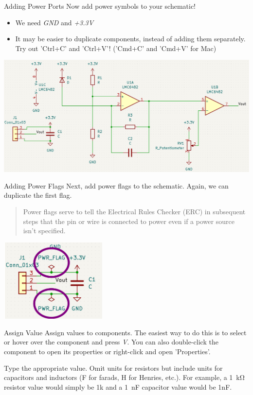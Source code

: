 \documentclass{beamer}
\begin{document}
\begin{frame}{Adding Power Ports}
  Now add power symbols to your schematic!
  \begin{itemize}
    \item We need \textit{GND} and \textit{+3.3V}
    \item It may be easier to duplicate components, instead of adding them separately. Try out 'Ctrl+C' and 'Ctrl+V'! ('Cmd+C' and 'Cmd+V' for Mac)
  \end{itemize}
  
  \centering
  \includegraphics[width=\textwidth]{images/schematic-power-symbols.png}
\end{frame}

\begin{frame}{Adding Power Flags}
  Next, add power flags to the schematic. Again, we can duplicate the first flag.\\

  \vfill
  \begin{quote}
  Power flags serve to tell the Electrical Rules Checker (ERC) in subsequent steps that the pin or wire is connected to power even if a power source isn't specified.
  \end{quote}

  \includegraphics[width=0.4\textwidth]{images/power-flags.png}
\end{frame}

\begin{frame}{Assign Value}
  Assign values to components. The easiest way to do this is to select or hover
  over the component and press \textit{V}. You can also double-click the component to
  open its properties or right-click and open 'Properties'.
  
  Type the appropriate value. Omit units for resistors but include units for
  capacitors and inductors (F for farads, H for Henries, etc.). For example, a
  \SI{1}{\kilo\ohm} resistor value would simply be 1k and a \SI{1}{\nano\farad} capacitor value would be 1nF.
\end{frame}
\end{document}
